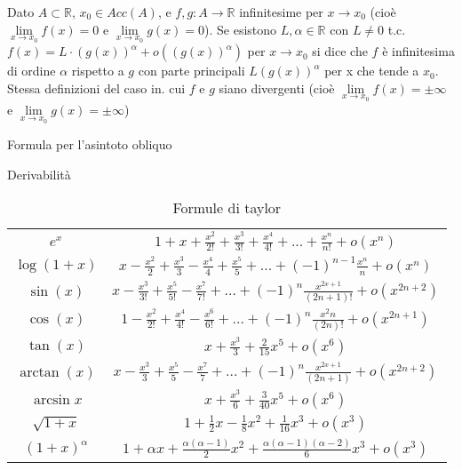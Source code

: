 \begin{definition}
	Dato $A \subset \mathbb{R}$, $x_0 \in Acc(A)$, e $f,g: A \to \mathbb{R}$ infinitesime per $x\to x_0$ (cioè $\lim\limits_{x\to x_0}f(x) = 0$ e $\lim\limits_{x\to x_0}g(x) = 0$). Se esistono $L, \alpha \in \mathbb{R}$ con $L \neq 0$ t.c. $f(x) = L \cdot (g(x))^\alpha + o((g(x))^\alpha)$ per $x\to x_0$ si dice che $f$ è infinitesima di ordine $\alpha$ rispetto a $g$ con parte principali $L(g(x))^\alpha$ per x che tende a $x_0$.\\
	Stessa definizioni del caso in. cui $f$ e $g$ siano divergenti (cioè $\lim\limits_{x\to x_0}f(x) = \pm\infty$ e $\lim\limits_{x\to x_0}g(x) = \pm\infty$)
\end{definition}

Formula per l'asintoto obliquo

Derivabilità

\begin{table}[h!]
	\setlength{\tabcolsep}{5pt}
	\renewcommand{\arraystretch}{2.2}
	\centering
	\begin{tabular}{|c|c|}
		\hline
		$e^x$ & $1 + x + \frac{x^2}{2!} + \frac{x^3}{3!} + \frac{x^4}{4!} + ... + \frac{x^n}{n!} + o(x^n)$  \\
		$\log(1+x)$ & $x - \frac{x^2}{2} + \frac{x^3}{3} - \frac{x^4}{4} + \frac{x^5}{5} + ... + (-1)^{n-1}\frac{x^n}{n} + o(x^n)$ \\
		$\sin(x)$ & $x - \frac{x^3}{3!} + \frac{x^5}{5!} - \frac{x^7}{7!} + ... + (-1)^n \frac{x^{2x+1}}{(2n+1)!} + o(x^{2n+2})$ \\
		$\cos(x)$ & $1 - \frac{x^2}{2!} + \frac{x^4}{4!} - \frac{x^6}{6!} + ... + (-1)^n\frac{x^2n}{(2n)!} + o(x^{2n+1})$ \\
		$\tan(x)$ & $x + \frac{x^3}{3} + \frac{2}{15}x^5 + o(x^6)$\\
		$\arctan(x)$ & $x - \frac{x^3}{3} + \frac{x^5}{5} - \frac{x^7}{7} + ... + (-1)^n\frac{x^{2x+1}}{(2n + 1)} + o(x^{2n+2})$\\
		$\arcsin{x}$ & $x + \frac{x^3}{6} + \frac{3}{40}x^5 + o(x^6)$\\
		$\sqrt{1+x}$ & $1 + \frac{1}{2}x - \frac{1}{8}x^2 + \frac{1}{16}x^3 + o(x^3)$\\
		$(1+x)^{\alpha}$ & $1 + \alpha x + \frac{\alpha(\alpha - 1)}{2}x^2 + \frac{\alpha(\alpha - 1)(\alpha - 2)}{6}x^3 + o(x^3)$\\
		\hline
	\end{tabular}
	\caption{Formule di taylor}
\end{table}

